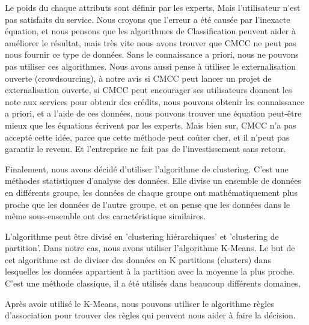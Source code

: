Le poids du chaque attributs sont définir par les experts, Mais l'utilisateur n'est pas satisfaits du service. Nous croyons que l'erreur a été causée par l'inexacte équation, et nous pensons que les algorithmes de Classification peuvent aider à améliorer le résultat, mais très vite nous avons trouver que CMCC ne peut pas nous fournir ce type de données. Sans le connaissance a priori, nous ne pouvons pas utiliser ces algorithmes. Nous avons aussi pense à utiliser le externalisation ouverte (crowdsourcing), à notre avis si CMCC peut lancer un projet de externalisation ouverte, si CMCC peut encourager ses utilisateurs donnent les note aux services pour obtenir des crédits, nous pouvons obtenir les connaissance a priori, et a l'aide de ces données, nous pouvons trouver une équation peut-être mieux que les équations écrivent par les experts. Mais bien sur, CMCC n'a pas accepté cette idée, parce que cette méthode peut coûter cher, et il n'peut pas garantir le revenu. Et l'entreprise ne fait pas de l'investissement sans retour.

Finalement, nous avons décidé d'utiliser l'algorithme de clustering. C'est une méthodes statistiques d'analyse des données. Elle divise un ensemble de données en différents groupe, les données de chaque groupe ont mathématiquement plus proche que les données de l'autre groupe,  et on pense que les données dans le même sous-ensemble ont des caractéristique similaires.

L'algorithme peut être divisé en 'clustering hiérarchiques' et 'clustering de partition'. Dans notre cas, nous avons utiliser l'algorithme K-Means. Le but de cet algorithme est de diviser des données en K partitions (clusters) dans lesquelles les données appartient à la partition avec la moyenne la plus proche. C'est une méthode classique, il a été utilisés dans beaucoup différents domaines, 

Après avoir utilisé le K-Means, nous pouvons utiliser le algorithme règles d'association pour trouver des règles qui peuvent nous aider à faire la décision.

















